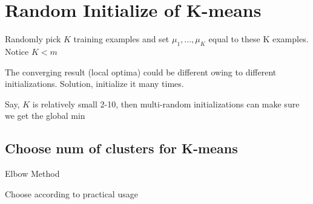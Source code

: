 \documentclass[10pt]{article}
\begin{document}
\section{Random Initialize of K-means}

Randomly pick $K$ training examples and set $\mu_1,...,\mu_K$ equal to these K examples. Notice $K<m$ 

The converging result (local optima) could be different owing to different initializations. Solution, initialize it many times. 

Say, $K$ is relatively small 2-10, then multi-random initializations can make sure we get the global min 

\subsection{Choose num of clusters for K-means}

Elbow Method

Choose according to practical usage
\end{document}
